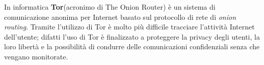 In informatica \textbf{Tor}(acronimo di The Onion Router) è un sistema di comunicazione anonima per Internet basato sul protocollo di rete di \textit{onion routing}. Tramite l'utilizzo di Tor è molto più difficile tracciare l'attività Internet dell'utente; difatti l'uso di Tor è finalizzato a proteggere la privacy degli utenti, la loro libertà e la possibilità di condurre delle comunicazioni confidenziali senza che vengano monitorate. \cite{wiki:tor}
